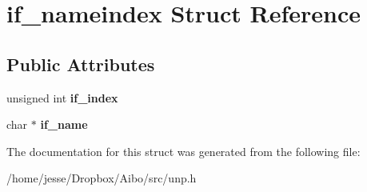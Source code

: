 \hypertarget{structif__nameindex}{
\section{if\_\-nameindex Struct Reference}
\label{structif__nameindex}
}
\subsection*{Public Attributes}
\begin{DoxyCompactItemize}
\item 
\hypertarget{structif__nameindex_a614c64e1c7abc1e2752860b14061f479}{
unsigned int {\bfseries if\_\-index}}
\label{structif__nameindex_a614c64e1c7abc1e2752860b14061f479}

\item 
\hypertarget{structif__nameindex_ab9d0f12e108f5f7ad0fccc951a4211b2}{
char $\ast$ {\bfseries if\_\-name}}
\label{structif__nameindex_ab9d0f12e108f5f7ad0fccc951a4211b2}

\end{DoxyCompactItemize}


The documentation for this struct was generated from the following file:\begin{DoxyCompactItemize}
\item 
/home/jesse/Dropbox/Aibo/src/unp.h\end{DoxyCompactItemize}
